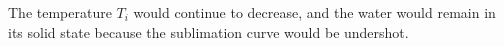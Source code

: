 The temperature \( T_i \) would continue to decrease, and the water would remain in its solid state because the sublimation curve would be undershot.